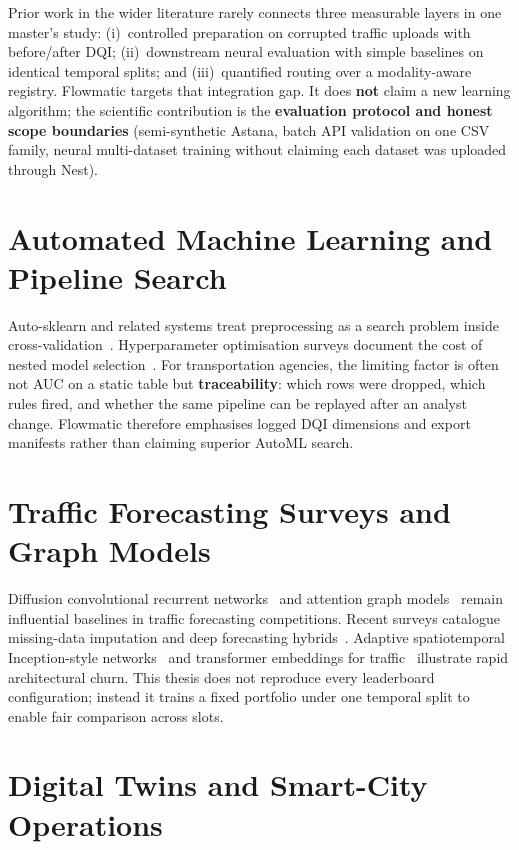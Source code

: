 Prior work in the wider literature rarely connects three measurable layers in one master's study: (i)~controlled preparation on corrupted traffic uploads with before/after DQI; (ii)~downstream neural evaluation with simple baselines on identical temporal splits; and (iii)~quantified routing over a modality-aware registry. Flowmatic targets that integration gap. It does \textbf{not} claim a new learning algorithm; the scientific contribution is the \textbf{evaluation protocol and honest scope boundaries} (semi-synthetic Astana, batch API validation on one CSV family, neural multi-dataset training without claiming each dataset was uploaded through Nest).

\section{Automated Machine Learning and Pipeline Search}

Auto-sklearn and related systems treat preprocessing as a search problem inside cross-validation~\cite{feurer2015autosklearn,feurer2019auto,kumar2021automl}. Hyperparameter optimisation surveys document the cost of nested model selection~\cite{feurer2019auto}. For transportation agencies, the limiting factor is often not AUC on a static table but \textbf{traceability}: which rows were dropped, which rules fired, and whether the same pipeline can be replayed after an analyst change. Flowmatic therefore emphasises logged DQI dimensions and export manifests rather than claiming superior AutoML search.

\section{Traffic Forecasting Surveys and Graph Models}

Diffusion convolutional recurrent networks~\cite{li2018diffusion} and attention graph models~\cite{guo2019attention} remain influential baselines in traffic forecasting competitions. Recent surveys catalogue missing-data imputation and deep forecasting hybrids~\cite{tang2024missing,benidis2022neural}. Adaptive spatiotemporal Inception-style networks~\cite{wang2023adaptive} and transformer embeddings for traffic~\cite{liu2023transformer,yan2021dynamic} illustrate rapid architectural churn. This thesis does not reproduce every leaderboard configuration; instead it trains a fixed portfolio under one temporal split to enable fair comparison across slots.

\section{Digital Twins and Smart-City Operations}

